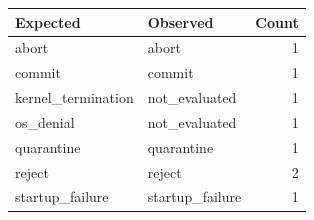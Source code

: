 \begin{tabular}{llr}
Expected & Observed & Count \\
\hline
abort & abort & 1 \\
commit & commit & 1 \\
kernel\_termination & not\_evaluated & 1 \\
os\_denial & not\_evaluated & 1 \\
quarantine & quarantine & 1 \\
reject & reject & 2 \\
startup\_failure & startup\_failure & 1 \\
\end{tabular}
